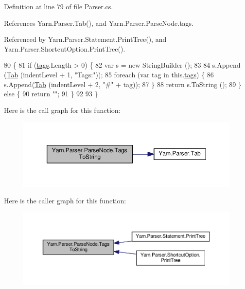 Definition at line 79 of file Parser.\-cs.



References Yarn.\-Parser.\-Tab(), and Yarn.\-Parser.\-Parse\-Node.\-tags.



Referenced by Yarn.\-Parser.\-Statement.\-Print\-Tree(), and Yarn.\-Parser.\-Shortcut\-Option.\-Print\-Tree().


\begin{DoxyCode}
80             \{
81                 \textcolor{keywordflow}{if} (\hyperlink{a00148_a58b3a15788fd2d4127d73619dc6d04ae}{tags}.Length > 0) \{
82                     var s = \textcolor{keyword}{new} StringBuilder ();
83 
84                     s.Append (\hyperlink{a00149_aa8fa36b46de12a1c561d77b99c4b9ae3}{Tab} (indentLevel + 1, \textcolor{stringliteral}{"Tags:"}));
85                     \textcolor{keywordflow}{foreach} (var tag \textcolor{keywordflow}{in} this.\hyperlink{a00148_a58b3a15788fd2d4127d73619dc6d04ae}{tags}) \{
86                         s.Append(\hyperlink{a00149_aa8fa36b46de12a1c561d77b99c4b9ae3}{Tab} (indentLevel + 2, \textcolor{stringliteral}{"#"} + tag));
87                     \}
88                     \textcolor{keywordflow}{return} s.ToString ();
89                 \} \textcolor{keywordflow}{else} \{
90                     \textcolor{keywordflow}{return} \textcolor{stringliteral}{""};
91                 \}
92 
93             \}
\end{DoxyCode}


Here is the call graph for this function\-:
\nopagebreak
\begin{figure}[H]
\begin{center}
\leavevmode
\includegraphics[width=350pt]{a00148_a054f36c80d5eeacd569a8859f599af67_cgraph}
\end{center}
\end{figure}




Here is the caller graph for this function\-:
\nopagebreak
\begin{figure}[H]
\begin{center}
\leavevmode
\includegraphics[width=350pt]{a00148_a054f36c80d5eeacd569a8859f599af67_icgraph}
\end{center}
\end{figure}



